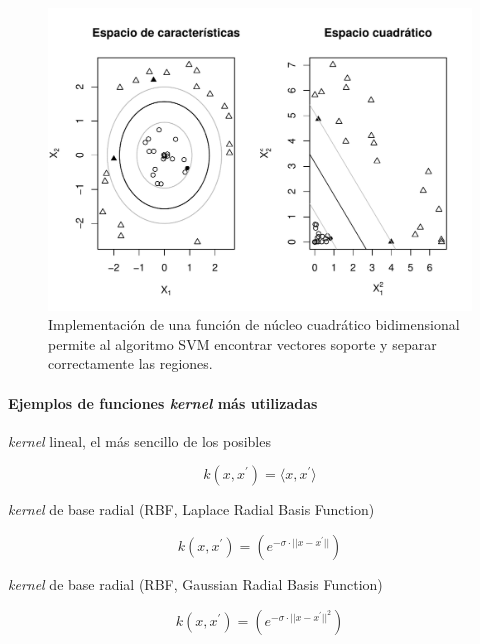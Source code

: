 \documentclass[12pt,spanish,a4paper]{article}
\let\oldparagraph\paragraph
\renewcommand{\paragraph}[1]{\oldparagraph{#1}\mbox{}}
\numberwithin{equation}{section}
\begin{document}
\begin{figure}[h]

{\centering \includegraphics[width=0.95\linewidth]{graphics/svm/kernel_cuadratico-1} 

}

\caption{Implementación de una función de núcleo cuadrático bidimensional permite al algoritmo SVM encontrar vectores soporte y separar correctamente las regiones.}\label{fig:kernel_cuadratico}
\end{figure}

\hypertarget{ejemplos-de-funciones-kernel-mas-utilizadas}{%
\paragraph{\texorpdfstring{Ejemplos de funciones \emph{kernel} más
utilizadas}{Ejemplos de funciones kernel más utilizadas}}\label{ejemplos-de-funciones-kernel-mas-utilizadas}}

\emph{kernel} lineal, el más sencillo de los posibles

\begin{equation}
k\left(x, x^{\prime}\right) = \langle x, x^{\prime}\rangle
\end{equation}

\emph{kernel} de base radial (RBF, Laplace Radial Basis Function)

\begin{equation}
k\left(x, x^{\prime}\right) = \left( e^{-\sigma\cdot ||x - x^{\prime}||}\right)
\end{equation}

\emph{kernel} de base radial (RBF, Gaussian Radial Basis Function)

\begin{equation}
k\left(x, x^{\prime}\right) = \left( e^{-\sigma\cdot ||x - x^{\prime}||^{2}}\right)
\end{equation}
\end{document}
